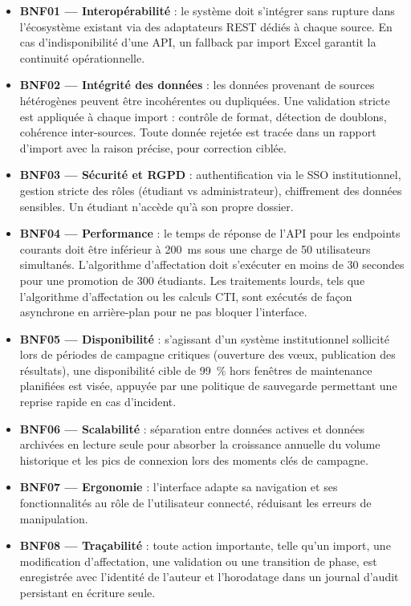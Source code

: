 \begin{itemize}
    \item \textbf{BNF01 --- Interopérabilité} : le système doit s'intégrer sans rupture dans l'écosystème existant via des adaptateurs REST dédiés à chaque source. En cas d'indisponibilité d'une API, un fallback par import Excel garantit la continuité opérationnelle.

    \item \textbf{BNF02 --- Intégrité des données} : les données provenant de sources hétérogènes peuvent être incohérentes ou dupliquées. Une validation stricte est appliquée à chaque import : contrôle de format, détection de doublons, cohérence inter-sources. Toute donnée rejetée est tracée dans un rapport d'import avec la raison précise, pour correction ciblée.

    \item \textbf{BNF03 --- Sécurité et RGPD} : authentification via le SSO institutionnel, gestion stricte des rôles (étudiant vs administrateur), chiffrement des données sensibles. Un étudiant n'accède qu'à son propre dossier.

    \item \textbf{BNF04 --- Performance} : le temps de réponse de l'API pour les endpoints courants doit être inférieur à 200~ms sous une charge de 50 utilisateurs simultanés. L'algorithme d'affectation doit s'exécuter en moins de 30 secondes pour une promotion de 300 étudiants. Les traitements lourds, tels que l'algorithme d'affectation ou les calculs CTI, sont exécutés de façon asynchrone en arrière-plan pour ne pas bloquer l'interface.

    \item \textbf{BNF05 --- Disponibilité} : s'agissant d'un système institutionnel sollicité lors de périodes de campagne critiques (ouverture des vœux, publication des résultats), une disponibilité cible de 99~\% hors fenêtres de maintenance planifiées est visée, appuyée par une politique de sauvegarde permettant une reprise rapide en cas d'incident.

    \item \textbf{BNF06 --- Scalabilité} : séparation entre données actives et données archivées en lecture seule pour absorber la croissance annuelle du volume historique et les pics de connexion lors des moments clés de campagne.

    \item \textbf{BNF07 --- Ergonomie} : l'interface adapte sa navigation et ses fonctionnalités au rôle de l'utilisateur connecté, réduisant les erreurs de manipulation.

    \item \textbf{BNF08 --- Traçabilité} : toute action importante, telle qu'un import, une modification d'affectation, une validation ou une transition de phase, est enregistrée avec l'identité de l'auteur et l'horodatage dans un journal d'audit persistant en écriture seule.
\end{itemize}


